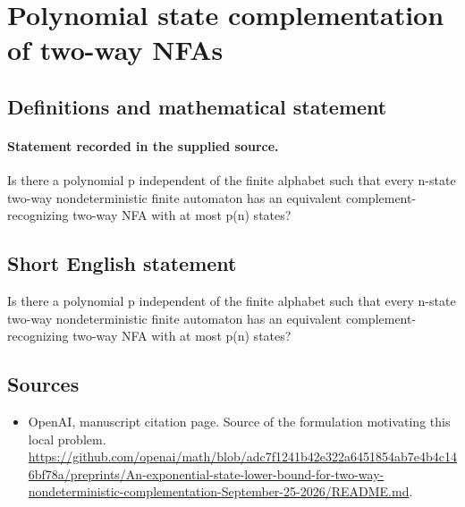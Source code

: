 \documentclass[11pt]{article}
\begin{document}
\section*{Polynomial state complementation of two-way NFAs}\label{statement}
\subsection{Definitions and mathematical statement}
\paragraph{Statement recorded in the supplied source.}
Is there a polynomial p independent of the finite alphabet such that every n-state two-way nondeterministic finite automaton has an equivalent complement-recognizing two-way NFA with at most p(n) states?
\subsection{Short English statement}
Is there a polynomial p independent of the finite alphabet such that every n-state two-way nondeterministic finite automaton has an equivalent complement-recognizing two-way NFA with at most p(n) states?
\subsection{Sources}
\begin{itemize}
\item[S1] OpenAI, manuscript citation page. Source of the formulation motivating this local problem.
\url{https://github.com/openai/math/blob/adc7f1241b42e322a6451854ab7e4b4c146bf78a/preprints/An-exponential-state-lower-bound-for-two-way-nondeterministic-complementation-September-25-2026/README.md}.
\end{itemize}
\end{document}
